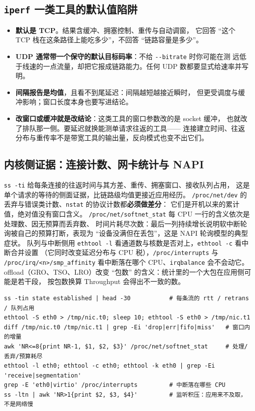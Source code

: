 \documentclass[12pt,a4paper,fontset=fandol]{ctexbook}
\newcommand{\Tp}[1]{\texttt{#1}}
\newcommand{\Opt}[1]{\texttt{-\/-#1}}
\newcommand{\Bk}{\discretionary{}{}{}}
\newcommand{\Lang}[1]{\textsf{#1}}
\newcommand{\MThr}{\Lang{Throughput}}
\begin{document}
\subsection{\Tp{iperf} 一类工具的默认值陷阱}
\label{sub:pm08-iperf}

\begin{itemize}
\item \textbf{默认是 TCP}。结果含缓冲、拥塞控制、重传与自动调窗，
  它回答 ``这个 TCP 栈在这条路径上能吃多少''，不回答 ``链路容量是多少''。
\item \textbf{UDP 通常带一个保守的默认目标码率}：不给 \Opt{bitrate} 时你可能在测
  远低于线速的一点流量，却把它报成链路能力。任何 UDP 数都要显式给速率并写明。
\item \textbf{间隔报告是均值}，且看不到尾延迟：间隔越短越接近瞬时，
  但更受调度与缓冲影响；窗口长度本身也要写进结论。
\item \textbf{改窗口或缓冲就是改结论}：这类工具的窗口参数改的是 socket 缓冲，
  也就改了排队那一侧。要延迟就换能测单请求往返的工具——
  连接建立时间、往返分布与重传率不是带宽工具的输出量，反向模式也变不出它们。
\end{itemize}

\subsection{内核侧证据：连接计数、网卡统计与 NAPI}
\label{sub:pm08-nic}

\Tp{ss -ti} 给每条连接的往返时间与其方差、重传、拥塞窗口、接收队列占用，
这是单个请求的等待的侧面证据，比链路级均值更接近应用经历。
\Tp{/proc/net/dev} 的丢弃与错误类计数、\Tp{nstat} 的协议计数都\textbf{必须做差分}：
它们是开机以来的累计值，绝对值没有窗口含义。
\Tp{/proc/net/softnet{\Bk}\_stat} 每 CPU 一行的含义依次是处理数、因无预算而丢弃数、
时间片耗尽次数：最后一列持续增长说明软中断轮询被自己的预算打断，表现为
``设备没满但在丢包''，这是 NAPI 轮询模型的典型症状。
队列与中断侧用 \Tp{ethtool -l} 看通道数与核数是否对上，\Tp{ethtool -c} 看中断合并设置
（它同时改变延迟分布与 CPU 税），\Tp{/proc/interrupts} 与
\Tp{/proc/irq/<n>/smp{\Bk}\_affinity} 看中断落在哪个 CPU、\Tp{irqbalance} 会不会动它。
offload（GRO、TSO、LRO）改变 ``包数'' 的含义：统计里的一个大包在应用侧可能是若干段，
按包数换算 \MThr{} 会得出不一致的数。

\begin{lstlisting}[style=shellstyle,caption={网络侧的窗口证据：所有计数都要两次快照相减},label={lst:pm08-net}]
ss -tin state established | head -30           # 每条流的 rtt / retrans / 队列占用
ethtool -S eth0 > /tmp/nic.t0; sleep 10; ethtool -S eth0 > /tmp/nic.t1
diff /tmp/nic.t0 /tmp/nic.t1 | grep -Ei 'drop|err|fifo|miss'   # 窗口内的增量
awk 'NR<=8{print NR-1, $1, $2, $3}' /proc/net/softnet_stat     # 处理/丢弃/预算耗尽
ethtool -l eth0; ethtool -c eth0; ethtool -k eth0 | grep -Ei 'receive|segmentation'
grep -E 'eth0|virtio' /proc/interrupts         # 中断落在哪些 CPU
ss -ltn | awk 'NR>1{print $2, $3, $4}'         # 监听积压：应用来不及取，不是网络慢
\end{lstlisting}
\end{document}
